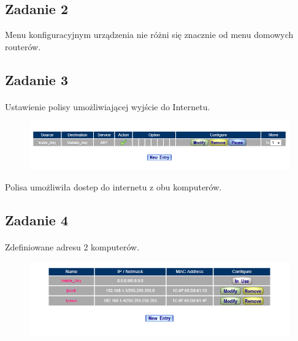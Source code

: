 \documentclass[wide,a4paper,titlepage,12pt] {article}
\begin{document}
  \subsection{Zadanie 2}
  Menu konfiguracyjnym urządzenia nie różni się znacznie od menu domowych routerów.


  \subsection{Zadanie 3}
  \paragraph{}
  Ustawienie polisy umożliwiającej wyjście do Internetu.
  \begin{figure}[h!]
    \begin{center}
      \includegraphics[width=\textwidth]{2.PNG}
    \end{center}
  \end{figure}

  Polisa umożliwiła dostep do internetu z obu komputerów.



  \subsection{Zadanie 4}
  \paragraph{}
  Zdefiniowane adresu 2 komputerów.
  \begin{figure}[h!]
    \begin{center}
      \includegraphics[width=\textwidth]{3.PNG}
    \end{center}
  \end{figure}
\end{document}
